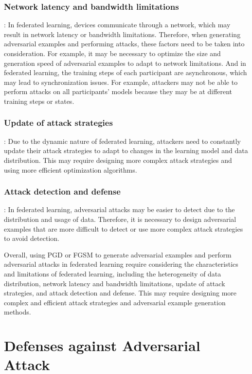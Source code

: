 \documentclass[conference]{IEEEtran}
\begin{document}
\subsubsection{Network latency and bandwidth limitations}: In federated learning,
devices communicate through a network, which may result in network
latency or bandwidth limitations. Therefore, when generating adversarial
examples and performing attacks, these factors need to be taken into
consideration. For example, it may be necessary to optimize the size
and generation speed of adversarial examples to adapt to network limitations.
And in federated learning, the training steps of each participant are asynchronous,
which may lead to synchronization issues. For example, attackers may not be able
to perform attacks on all participants' models because they may be at
different training steps or states.

\subsubsection{Update of attack strategies}: Due to the dynamic nature of federated
learning, attackers need to constantly update their attack strategies
to adapt to changes in the learning model and data distribution. This
may require designing more complex attack strategies and using more
efficient optimization algorithms.

\subsubsection{Attack detection and defense}: In federated learning, adversarial
attacks may be easier to detect due to the distribution and usage
of data. Therefore, it is necessary to design adversarial examples
that are more difficult to detect or use more complex attack strategies
to avoid detection.

Overall, using PGD or FGSM to generate adversarial examples and perform
adversarial attacks in federated learning require considering the
characteristics and limitations of federated learning, including
the heterogeneity of data distribution, network latency and bandwidth
limitations, update of attack strategies, and attack detection and defense.
This may require designing more complex and efficient attack strategies
and adversarial example generation methods.


\section{Defenses against Adversarial Attack}
\end{document}
